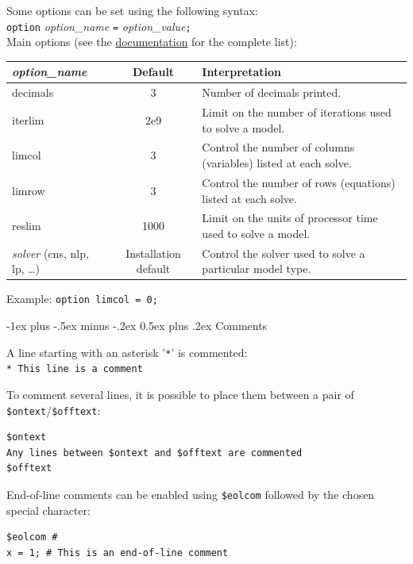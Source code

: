 \documentclass[10pt,landscape,a4paper]{article}
\makeatletter
\renewcommand{\section}{\@startsection{section}{1}{0mm}%
                                {-1ex plus -.5ex minus -.2ex}%
                                {0.5ex plus .2ex}%
                                {\color{blue}\normalfont\large\bfseries}}
\makeatother
\begin{document}
\begin{multicols}{2}
Some options can be set using the following syntax:\\
\texttt{option} \emph{option\_name} \texttt{=} \emph{option\_value}\texttt{;}\\
Main options (see the
\href{http://www.gams.com/help/topic/gams.doc/userguides/userguide/_u_g__option_statement.html?cp=0_2_0_2_4_1#UG_OptionStatement_ListOfOptions}{documentation}
for the complete list):\\
\begin{tabularx}{\columnwidth}{@{}>{\ttfamily}lcX@{}}
  \emph{\textrm{option\_name}} & Default & Interpretation \\
  \toprule
  decimals & 3 & Number of decimals printed.\\
  iterlim& 2e9 & Limit on the number of iterations used to solve a model. \\
  limcol& 3 & Control the number of columns (variables) listed at each solve.\\
  limrow& 3 & Control the number of rows (equations) listed at each solve.\\
  reslim& 1000 & Limit on the units of processor time used to solve a model.\\
  \emph{\textrm{solver}} \textrm{(}cns\textrm{, }nlp\textrm{, }lp\textrm{, \ldots)}&
  Installation default& Control the solver used to solve a particular model type.
\end{tabularx}
Example: \texttt{option limcol = 0;}

\section{Comments}

A line starting with an asterisk '\verb!*!' is commented:\\
\verb!* This line is a comment!

To comment several lines, it is possible to place them between a pair of
\verb!$ontext!/\verb!$offtext!:\\
\begin{verbatim}
$ontext
Any lines between $ontext and $offtext are commented
$offtext
\end{verbatim}

End-of-line comments can be enabled using \verb!$eolcom! followed by the
chosen special character:\\
\begin{verbatim}
$eolcom #
x = 1; # This is an end-of-line comment
\end{verbatim}


\end{multicols}
\end{document}
